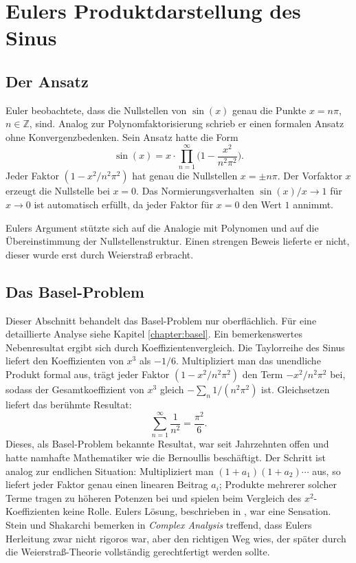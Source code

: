 %
%
%
%
\section{Eulers Produktdarstellung des Sinus}

\subsection{Der Ansatz}

Euler beobachtete, dass die Nullstellen von $\sin(x)$ genau die Punkte
$x = n\pi$, $n \in \mathbb{Z}$, sind.
Analog zur Polynomfaktorisierung schrieb er einen formalen Ansatz ohne Konvergenzbedenken.
Sein Ansatz hatte die Form
\begin{equation}
\sin(x)
=
x \cdot \prod_{n=1}^{\infty} \biggl(1 - \frac{x^2}{n^2 \pi^2}\biggr).
\end{equation}
Jeder Faktor $(1 - x^2/n^2\pi^2)$ hat genau die Nullstellen $x = \pm n\pi$.
Der Vorfaktor $x$ erzeugt die Nullstelle bei $x = 0$.
Das Normierungsverhalten $\sin(x)/x \to 1$ für $x \to 0$ ist automatisch erfüllt,
da jeder Faktor für $x = 0$ den Wert $1$ annimmt.

Eulers Argument stützte sich auf die Analogie mit Polynomen und auf die
Übereinstimmung der Nullstellenstruktur.
Einen strengen Beweis lieferte er nicht, dieser wurde erst durch Weierstraß erbracht.

\subsection{Das Basel-Problem}

Dieser Abschnitt behandelt das Basel-Problem nur oberflächlich.
%
Für eine detaillierte Analyse siehe Kapitel \ref{chapter:basel}.
Ein bemerkenswertes Nebenresultat ergibt sich durch Koeffizientenvergleich.
Die Taylorreihe des Sinus liefert den Koeffizienten von $x^3$ als $-1/6$.
Multipliziert man das unendliche Produkt formal aus, trägt jeder Faktor
$(1 - x^2/n^2\pi^2)$ den Term $-x^2/n^2\pi^2$ bei,
sodass der Gesamtkoeffizient von $x^3$ gleich $-\sum_n 1/(n^2\pi^2)$ ist.
Gleichsetzen liefert das berühmte Resultat:
\begin{equation}
\sum_{n=1}^{\infty} \frac{1}{n^2}
=
\frac{\pi^2}{6}.
\end{equation}
Dieses, als Basel-Problem bekannte Resultat, war seit Jahrzehnten offen
und hatte namhafte Mathematiker wie die Bernoullis beschäftigt.
%
Der Schritt ist analog zur endlichen Situation:
Multipliziert man $(1+a_1)(1+a_2)\cdots$ aus, so liefert jeder Faktor genau
einen linearen Beitrag $a_i$;
Produkte mehrerer solcher Terme tragen zu höheren Potenzen bei und spielen
beim Vergleich des $x^2$-Koeffizienten keine Rolle.
Eulers Lösung, beschrieben in \cite{produkt:euler}, war eine Sensation.
Stein und Shakarchi bemerken in \textit{Complex Analysis} \cite{produkt:steinShakarchi} treffend,
dass Eulers Herleitung zwar nicht rigoros war, aber den richtigen Weg wies,
der später durch die Weierstraß-Theorie vollständig gerechtfertigt werden sollte.

